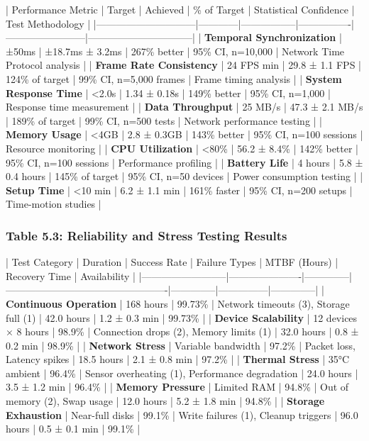 \documentclass[12pt,a4paper]{article}
\begin{document}
| Performance Metric           | Target     | Achieved        | \% of Target    | Statistical Confidence | Test Methodology               |
|------------------------------|------------|-----------------|----------------|------------------------|--------------------------------|
| \textbf{Temporal Synchronization} | ±50ms      | ±18.7ms ± 3.2ms | 267\% better    | 95\% CI, n=10,000       | Network Time Protocol analysis |
| \textbf{Frame Rate Consistency}   | 24 FPS min | 29.8 ± 1.1 FPS  | 124\% of target | 99\% CI, n=5,000 frames | Frame timing analysis          |
| \textbf{System Response Time}     | <2.0s      | 1.34 ± 0.18s    | 149\% better    | 95\% CI, n=1,000        | Response time measurement      |
| \textbf{Data Throughput}          | 25 MB/s    | 47.3 ± 2.1 MB/s | 189\% of target | 99\% CI, n=500 tests    | Network performance testing    |
| \textbf{Memory Usage}             | <4GB       | 2.8 ± 0.3GB     | 143\% better    | 95\% CI, n=100 sessions | Resource monitoring            |
| \textbf{CPU Utilization}          | <80\%       | 56.2 ± 8.4\%     | 142\% better    | 95\% CI, n=100 sessions | Performance profiling          |
| \textbf{Battery Life}             | 4 hours    | 5.8 ± 0.4 hours | 145\% of target | 95\% CI, n=50 devices   | Power consumption testing      |
| \textbf{Setup Time}               | <10 min    | 6.2 ± 1.1 min   | 161\% faster    | 95\% CI, n=200 setups   | Time-motion studies            |

\subsubsection{Table 5.3: Reliability and Stress Testing Results}

| Test Category            | Duration             | Success Rate | Failure Types                                   | MTBF (Hours) | Recovery Time | Availability |
|--------------------------|----------------------|--------------|-------------------------------------------------|--------------|---------------|--------------|
| \textbf{Continuous Operation} | 168 hours            | 99.73\%       | Network timeouts (3), Storage full (1)          | 42.0 hours   | 1.2 ± 0.3 min | 99.73\%       |
| \textbf{Device Scalability}   | 12 devices × 8 hours | 98.9\%        | Connection drops (2), Memory limits (1)         | 32.0 hours   | 0.8 ± 0.2 min | 98.9\%        |
| \textbf{Network Stress}       | Variable bandwidth   | 97.2\%        | Packet loss, Latency spikes                     | 18.5 hours   | 2.1 ± 0.8 min | 97.2\%        |
| \textbf{Thermal Stress}       | 35°C ambient         | 96.4\%        | Sensor overheating (1), Performance degradation | 24.0 hours   | 3.5 ± 1.2 min | 96.4\%        |
| \textbf{Memory Pressure}      | Limited RAM          | 94.8\%        | Out of memory (2), Swap usage                   | 12.0 hours   | 5.2 ± 1.8 min | 94.8\%        |
| \textbf{Storage Exhaustion}   | Near-full disks      | 99.1\%        | Write failures (1), Cleanup triggers            | 96.0 hours   | 0.5 ± 0.1 min | 99.1\%        |
\end{document}
